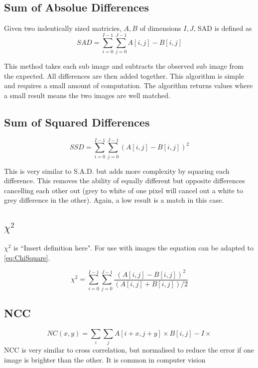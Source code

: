 \subsection{Sum of Absolue Differences}

Given two indentically sized matricies, $A, B$ of dimensions $I,J$, SAD is defined as
\begin{equation} \label{eq:SAD}
SAD = \sum\limits_{i=0}^{I-1} \sum\limits_{j=0}^{J-1} A[i,j] - B[i,j] 
\end{equation}

This method takes each sub image and subtracts the observed sub image from the expected. All differences are then added together. This algorithm is simple and requires a small amount of computation. The algorithm returns values where a small result means the two images are well matched.

\subsection{Sum of Squared Differences}
\begin{equation}\label{eq:SSD}
SSD = \sum\limits_{i=0}^{I-1} \sum\limits_{j=0}^{J-1} (A[i,j] - B[i,j] )^2
\end{equation}

This is very similar to S.A.D. but adds more complexity by squaring each difference. This removes the ability of equally different but opposite differences cancelling each other out (grey to white of one pixel will cancel out a white to grey difference in the other). Again, a low result is a match in this case.

\subsection{$\chi ^{2}$ }
$\chi ^{2}$ is ``Insert definition here". For use with images the equation can be adapted to \ref{eq:ChiSquare}. 

\begin{equation} \label{eq:ChiSquare}
\chi ^{2} = \sum\limits_{i=0}^{I-1} \sum\limits_{j=0}^{J-1}\frac{(A[i,j] - B[i,j])^2}{(A[i,j]+B[i,j])/2}
\end{equation}


\subsection{NCC}
\begin{equation}\label{eq:NCC}
NC(x,y) =  \sum\limits_i \sum\limits_j A[i+x, j+y]\times B[i,j] - I\times 
\end{equation}
NCC is very similar to cross correlation, but normalised to reduce the error if one image is brighter than the other. It is common in computer vision \cite{}


